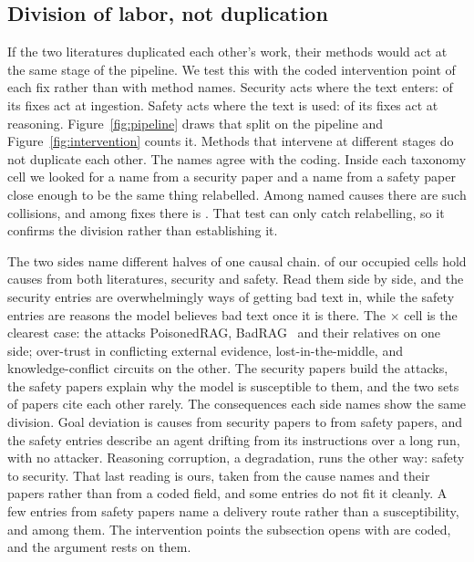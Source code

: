 \subsection{Division of labor, not duplication}
\label{sec:parallel}

If the two literatures duplicated each other's work, their methods would act
at the same stage of the pipeline. We test this with the coded intervention
point of each fix rather than with method names. Security acts where the
text enters: \NDefPtIngestionSec{} of its fixes act at ingestion.
Safety acts where the text is used: \NDefPtReasoningSafety{} of its
fixes act at reasoning. Figure~\ref{fig:pipeline} draws that split on the pipeline and Figure~\ref{fig:intervention} counts it. Methods
that intervene at different stages do not duplicate each other. The names agree with the coding. Inside each taxonomy cell we looked for a
name from a security paper and a name from a safety paper close enough to be the same
thing relabelled. Among \NMechanisms{} named causes there are
\NMechNameClash{} such collisions, and among \NFixes{} fixes there
is \NDefNameClash{}. That test can only catch relabelling, so it confirms
the division rather than establishing it.


The two sides name different halves of one causal chain. \NSharedCells{} of our
\NOccupiedCells{} occupied cells hold causes from both literatures,
\NMechSharedSec{} security and \NMechSharedSafety{} safety. Read them side by
side, and the security entries are overwhelmingly ways of getting bad text in, while
the safety entries are reasons the model believes bad text once it is there. The
 $\times$  cell is the clearest case:
the attacks PoisonedRAG, BadRAG~\cite{xue-2024-badrag} and their relatives on one side; over-trust in conflicting
external evidence, lost-in-the-middle, and knowledge-conflict circuits on the
other. The security papers build the attacks, the safety papers explain why
the model is susceptible to them, and the two sets of papers cite each other
rarely. The consequences each side names show the same division. Goal deviation is
\NGoalHijackSec{} causes from security papers to \NGoalHijackSafety{} from
safety papers, and the safety entries describe an agent drifting from its
instructions over a long run, with no attacker. Reasoning corruption, a degradation, runs
the other way: \NReasonSafety{} safety to \NReasonSec{} security. That last reading is ours, taken from the cause names and their papers
rather than from a coded field, and some entries do not fit it cleanly. A few
entries from safety papers name a delivery route rather than a susceptibility,
 and  among
them. The intervention points the subsection opens with are coded, and the
argument rests on them.

